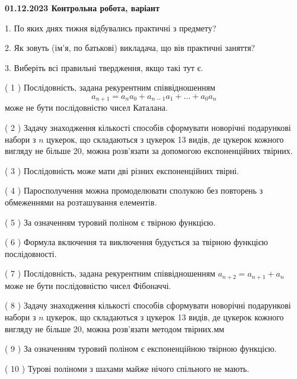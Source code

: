 \documentclass[12pt, ukrainian]{article}
\begin{document}
\vspace{4mm}
\newpage
\begin {large}

\textbf{01.12.2023 Контрольна робота, варіант  }\par


{
1. По яких днях тижня відбувались практичні з предмету?



\vspace{5mm}
2. Як зовуть (ім'я, по батькові) викладача, що вів практичні заняття?



\vspace{5mm}
3. Виберіть всі правильні твердження, якщо такі тут є.\par
\vspace{2mm}
( 1 ) Послідовність, задана рекурентним співвідношенням $$a_{n+1}=a_{n}a_{0}+a_{n-1}a_{1}+\ldots+a_0a_{n}$$ може не бути послідовністю чисел Каталана.%

( 2 ) Задачу знаходження кількості способів сформувати новорічні подарункові набори з $n$ цукерок, що складаються з цукерок 13 видів, де цукерок кожного вигляду не більше 20, можна розв’язати за допомогою експоненційних твірних.%

( 3 ) Послідовність може мати дві різних експоненційних твірні.%

( 4 ) Паросполучення можна промоделювати сполукою без повторень з обмеженнями на розташування елементів.%

( 5 ) За означенням туровий поліном є твірною функцією.%

( 6 ) Формула включення та виключення будується за твірною функцією послідовності.%

( 7 ) Послідовність, задана рекурентним співвідношенням $a_{n+2}=a_{n+1}+a_{n}$ може не бути послідовністю чисел Фібоначчі.%

( 8 ) Задачу знаходження кількості способів сформувати новорічні подарункові набори з $n$ цукерок, що складаються з цукерок 13 видів, де цукерок кожного вигляду не більше 20, можна розв’язати методом твірних.мм%

( 9 ) За означенням туровий поліном є експоненційною твірною функцією.%

( 10 ) Турові поліноми з шахами майже нічого спільного не мають.%
}
\end {large}
\end{document}

